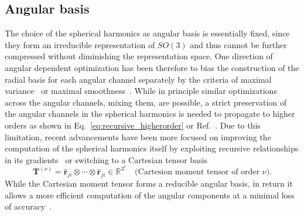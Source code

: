 \subsection{Angular basis}
The choice of the spherical harmonics as angular basis is essentially fixed, since they form an irreducible representation of $SO(3)$ and thus cannot be further compressed without diminishing the representation space. %
%
%
One direction of angular dependent optimization has been therefore to bias the construction of the radial basis for each angular channel separately by the criteria of maximal variance~\cite{goscinski2021optimal} or maximal smoothness~\cite{bigi2022smooth}.
While in principle similar optimizations across the angular channels, mixing them, are possible, a strict preservation of the angular channels in the spherical harmonics is needed to propagate to higher orders as shown in Eq.~\eqref{eq:recursive_higherorder} or Ref.~\cite{kondor2018clebsch}.
Due to this limitation, recent advancements have been more focused on improving the computation of the spherical harmonics itself by exploiting recursive relationships in its gradients~\cite{bigi2023sphericart} or switching to a Cartesian tensor basis~\cite{shapeev2016moment,schutt2021equivariant,simeon2023tensornet}
\begin{equation}
  \mathbf{T}^{(\nu)} = \hat{\mathbf{r}}_{ji} \otimes \cdots \otimes\hat{\mathbf{r}}_{ji}\in\mathbb{R}^{3^\nu}\quad \text{(Cartesion moment tensor of order $\nu$).}
\end{equation}
While the Cartesian moment tensor forms a reducible angular basis, in return it allows a more efficient computation of the angular components at a minimal loss of accuracy~\cite{zuo2020performance}.

